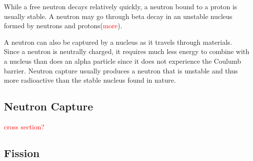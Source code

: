 \documentclass[preprint,aip,cha]{revtex4-1}
\newcommand{\red}[1]{\textcolor{red}{#1}}
\begin{document}
        While a free neutron decays relatively quickly, a neutron bound to a proton is usually stable.
        A neutron may go through beta decay in an unstable nucleus formed by neutrons and protons(\red{more}). 

        A neutron can also be captured by a nucleus as it travels through materials. Since a neutron is neutrally
        charged, it requires much less energy to combine with a nucleus than does
        an alpha particle since it does not experience the Coulumb barrier.
        Neutron capture usually produces a neutron that is unstable and thus
        more radioactive than the stable nucleus found in nature.

    \subsection{Neutron Capture}
        \red{cross section?}
    \subsection{Fission}
\end{document}
